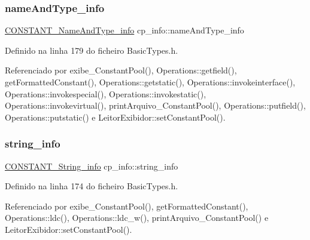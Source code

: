 \mbox{\label{structcp__info_a1e020df4bc85c0a41365a8bb466f8781}} 
\subsubsection{\texorpdfstring{name\+And\+Type\+\_\+info}{nameAndType\_info}}
{\footnotesize\ttfamily \hyperlink{structCONSTANT__NameAndType__info}{C\+O\+N\+S\+T\+A\+N\+T\+\_\+\+Name\+And\+Type\+\_\+info} cp\+\_\+info\+::name\+And\+Type\+\_\+info}



Definido na linha 179 do ficheiro Basic\+Types.\+h.



Referenciado por exibe\+\_\+\+Constant\+Pool(), Operations\+::getfield(), get\+Formatted\+Constant(), Operations\+::getstatic(), Operations\+::invokeinterface(), Operations\+::invokespecial(), Operations\+::invokestatic(), Operations\+::invokevirtual(), print\+Arquivo\+\_\+\+Constant\+Pool(), Operations\+::putfield(), Operations\+::putstatic() e Leitor\+Exibidor\+::set\+Constant\+Pool().

\mbox{\label{structcp__info_a4d1d5a06448e8b86b4b23608d64cfe7e}} 
\subsubsection{\texorpdfstring{string\+\_\+info}{string\_info}}
{\footnotesize\ttfamily \hyperlink{structCONSTANT__String__info}{C\+O\+N\+S\+T\+A\+N\+T\+\_\+\+String\+\_\+info} cp\+\_\+info\+::string\+\_\+info}



Definido na linha 174 do ficheiro Basic\+Types.\+h.



Referenciado por exibe\+\_\+\+Constant\+Pool(), get\+Formatted\+Constant(), Operations\+::ldc(), Operations\+::ldc\+\_\+w(), print\+Arquivo\+\_\+\+Constant\+Pool() e Leitor\+Exibidor\+::set\+Constant\+Pool().

\mbox{\label{structcp__info_a045b8801a6e96a2a31d3b62ea684f141}} 
